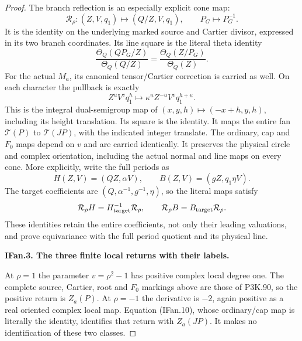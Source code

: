 \begin{proof}
The branch reflection is an especially explicit cone map:
\[
 \mathcal R_\rho:(Z,V,q_1)\longmapsto(Q/Z,V,q_1),
 \qquad P_G\longmapsto P_G^{-1}.                    \tag{IFan.10}
\]
It is the identity on the underlying marked source and Cartier
divisor, expressed in its two branch coordinates. Its line square
is the literal theta identity
\[
 \frac{\Theta_Q(QP_G/Z)}{\Theta_Q(Q/Z)}
       =\frac{\Theta_Q(Z/P_G)}{\Theta_Q(Z)}.
\]
For the actual \(M_a\), its canonical tensor/Cartier correction is
carried as well. On each character the pullback is exactly
\[
 Z^uV^v q_1^h\longmapsto
          \kappa^u Z^{-u}V^v q_1^{h+u}.             \tag{IFan.11}
\]
This is the integral dual-semigroup map of
\((x,y,h)\mapsto(-x+h,y,h)\), including its height translation. Its
square is the identity. It maps the entire fan \(\mathcal T(P)\) to
\(\mathcal T(JP)\), with the indicated integer translate. The ordinary,
cap and \(F_0\) maps depend on \(v\) and are carried identically.
It preserves the physical circle and complex orientation, including
the actual normal and line maps on every cone. More explicitly, write
the full periods as
\[
 H(Z,V)=(QZ,\alpha V),\qquad
 B(Z,V)=(gZ,q_1\eta V).
\]
The target coefficients are \((Q,\alpha^{-1},g^{-1},\eta)\), so the
literal maps satisfy
\[
 \mathcal R_\rho H=H_{\rm target}^{-1}\mathcal R_\rho,
 \qquad \mathcal R_\rho B=B_{\rm target}\mathcal R_\rho.
\]
These identities retain the entire coefficients, not only their
leading valuations, and prove equivariance with the full period
quotient and its physical line.

\par\medskip\noindent\textbf{IFan.3. The three finite local returns with their labels.}\par\nopagebreak[4]

At \(\rho=1\) the parameter \(v=\rho^2-1\) has positive complex
local degree one. The complete source, Cartier, root and \(F_0\)
markings above are those of P3K.90, so the positive return is
\(Z_a(P)\). At \(\rho=-1\) the derivative is \(-2\), again positive
as a real oriented complex local map. Equation (IFan.10), whose
ordinary/cap map is literally the identity, identifies that return
with \(Z_a(JP)\). It makes no identification of these two classes.


\end{proof}
